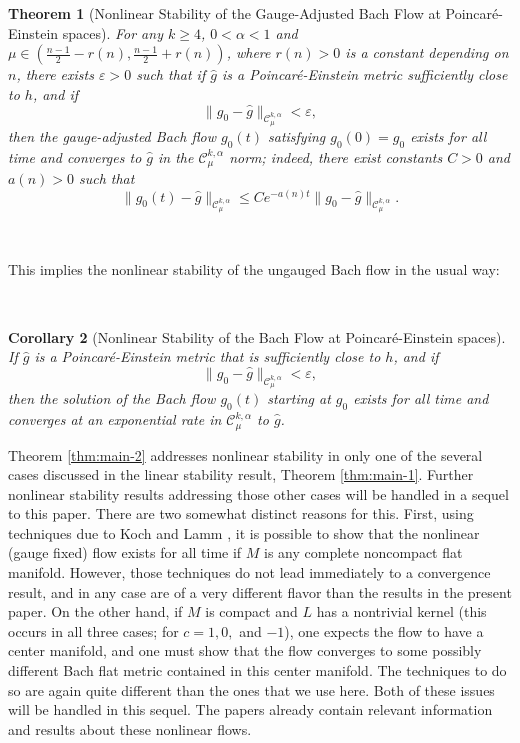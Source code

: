 \documentclass[10pt,reqno]{amsart}
\newtheorem{theorem}{Theorem}[section]
\newtheorem{cor}[theorem]{Corollary}
\newcommand{\vep}{\varepsilon}
\begin{document}
\begin{theorem}[Nonlinear Stability of the Gauge-Adjusted Bach Flow at Poincar\'e-Einstein spaces]
\label{thm: main P-E} 
For any $k\geq 4$, $0 < \alpha < 1$ and $\mu \in (\frac{n-1}{2} - r(n), \frac{n-1}{2}+r(n))$, where $r(n)>0$ is a constant depending on $n$, there exists $\vep > 0$ such that if  
$\hat{g}$ is a Poincar\'e-Einstein metric sufficiently close to $h$, 
and if
\begin{equation*}
\| g_0 - \hat{g} \|_{\mathcal C^{k,\alpha}_{\mu}} < \vep,
\end{equation*}
then the gauge-adjusted Bach flow $g_0(t)$ satisfying $g_0(0) = g_0$ exists for all time and converges to $\hat{g}$ in the $\mathcal C^{k,\alpha}_{\mu}$ norm; indeed, there exist constants $C>0$ and $a(n)>0$
such that 
\begin{equation} \label{eqn:exp-decay-pe}
\| g_0 (t) - \hat{g} \|_{\mathcal C^{k,\alpha}_{\mu}} \leq C e^{-a(n) t} \| g_0 - \hat{g} \|_{\mathcal C^{k,\alpha}_{\mu}}.
\end{equation}
\end{theorem}

\

This implies the nonlinear stability of the ungauged Bach flow in the usual way:

\

\begin{cor}[Nonlinear Stability of the Bach Flow at Poincar\'e-Einstein spaces] 
\label{cor:main P-E}
If $\hat{g}$ is a Poincar\'e-Einstein metric that is sufficiently close to $h$, and if \[\|g_0 - \hat{g} \|_{\mathcal C^{k,\alpha}_{\mu}} < \vep,\]
then the solution of the Bach flow $g_0(t)$ starting at $g_0$ exists for all time and converges at an exponential rate in $\mathcal C^{k,\alpha}_\mu$ to $\hat{g}$. 
\end{cor}


Theorem \ref{thm:main-2} addresses nonlinear stability in only one of the several cases discussed in the linear stability result, Theorem \ref{thm:main-1}.  Further nonlinear stability
results addressing those other cases will be handled in a sequel to this paper.  There are two somewhat distinct reasons for this. First, using techniques 
due to Koch and Lamm \cite{KL}, it is possible to show that the nonlinear (gauge fixed) flow exists for all time if $M$ is any complete 
noncompact flat manifold.  However, those techniques do not lead immediately to a convergence result, and in any case are of a very different flavor 
than the results in the present paper.  On the other hand, if $M$ is compact and $L$ has a nontrivial kernel (this occurs in all three cases; for $c = 1, 0,$ and $-1$), one expects the flow to have a center manifold, and one must show that the flow converges to some possibly different Bach flat metric 
contained in this center manifold. The techniques to do so are again quite different than the ones that we use here.   Both of these issues will be handled in this sequel.  
The papers \cite{BGIM2, BGIM} already contain relevant information and results about these nonlinear flows. 
\end{document}
